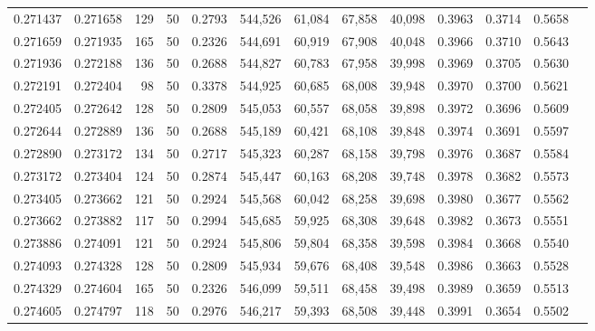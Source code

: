\begin{tabular}{rrrrrrrrrrrrr}
0.271437 & 0.271658 &   129 &  50 &                                     0.2793 & 544,526 &  61,084 &  67,858 &  40,098 & 0.3963 & 0.3714 & 0.5658 \\
0.271659 & 0.271935 &   165 &  50 &                                     0.2326 & 544,691 &  60,919 &  67,908 &  40,048 & 0.3966 & 0.3710 & 0.5643 \\
0.271936 & 0.272188 &   136 &  50 &                                     0.2688 & 544,827 &  60,783 &  67,958 &  39,998 & 0.3969 & 0.3705 & 0.5630 \\
0.272191 & 0.272404 &    98 &  50 &                                     0.3378 & 544,925 &  60,685 &  68,008 &  39,948 & 0.3970 & 0.3700 & 0.5621 \\
0.272405 & 0.272642 &   128 &  50 &                                     0.2809 & 545,053 &  60,557 &  68,058 &  39,898 & 0.3972 & 0.3696 & 0.5609 \\
0.272644 & 0.272889 &   136 &  50 &                                     0.2688 & 545,189 &  60,421 &  68,108 &  39,848 & 0.3974 & 0.3691 & 0.5597 \\
0.272890 & 0.273172 &   134 &  50 &                                     0.2717 & 545,323 &  60,287 &  68,158 &  39,798 & 0.3976 & 0.3687 & 0.5584 \\
0.273172 & 0.273404 &   124 &  50 &                                     0.2874 & 545,447 &  60,163 &  68,208 &  39,748 & 0.3978 & 0.3682 & 0.5573 \\
0.273405 & 0.273662 &   121 &  50 &                                     0.2924 & 545,568 &  60,042 &  68,258 &  39,698 & 0.3980 & 0.3677 & 0.5562 \\
0.273662 & 0.273882 &   117 &  50 &                                     0.2994 & 545,685 &  59,925 &  68,308 &  39,648 & 0.3982 & 0.3673 & 0.5551 \\
0.273886 & 0.274091 &   121 &  50 &                                     0.2924 & 545,806 &  59,804 &  68,358 &  39,598 & 0.3984 & 0.3668 & 0.5540 \\
0.274093 & 0.274328 &   128 &  50 &                                     0.2809 & 545,934 &  59,676 &  68,408 &  39,548 & 0.3986 & 0.3663 & 0.5528 \\
0.274329 & 0.274604 &   165 &  50 &                                     0.2326 & 546,099 &  59,511 &  68,458 &  39,498 & 0.3989 & 0.3659 & 0.5513 \\
0.274605 & 0.274797 &   118 &  50 &                                     0.2976 & 546,217 &  59,393 &  68,508 &  39,448 & 0.3991 & 0.3654 & 0.5502 \\

\end{tabular}
